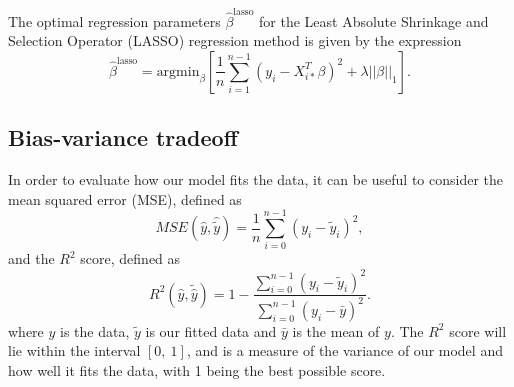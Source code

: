 \documentclass[a4paper, 10pt]{article}
\begin{document}
\begin{multicols}{2}
The optimal regression parameters $\hat{\beta}^\text{lasso}$ for the Least Absolute Shrinkage and Selection Operator (LASSO) regression method is given by the expression
\begin{equation}
    \hat{\beta}^\text{lasso} =  \text{argmin}_\beta \left[  \frac{1}{n}\sum_{i=1}^{n-1}(y_i-X_{i*}^T\beta)^2 + \lambda ||\beta||_1  \right].
    \label{eq:argminbeta_lasso}
\end{equation}

\subsection{Bias-variance tradeoff}
In order to evaluate how our model fits the data, it can be useful to consider the mean squared error (MSE), defined as 
\begin{equation}
    MSE(\hat{y},\hat{\tilde{y}}) = \frac{1}{n}
    \sum_{i=0}^{n-1}(y_i-\tilde{y}_i)^2, 
    \label{eq:MSE}
\end{equation}
and the $R^2$ score, defined as 
\begin{equation}
    R^2(\hat{y}, \tilde{\hat{y}}) = 1 - \frac{\sum_{i=0}^{n - 1} (y_i - \tilde{y}_i)^2}{\sum_{i=0}^{n - 1} (y_i - \bar{y})^2}.
    \label{eq:R2}
\end{equation}
where $y$ is the data, $\tilde{y}$ is our fitted data and $\bar{y}$ is the mean of $y$.  The $R^2$ score will lie within the interval $[0,\ 1]$, and is a measure of the variance of our model and how well it fits the data, with 1 being the best possible score. 


\end{multicols}
\end{document}
